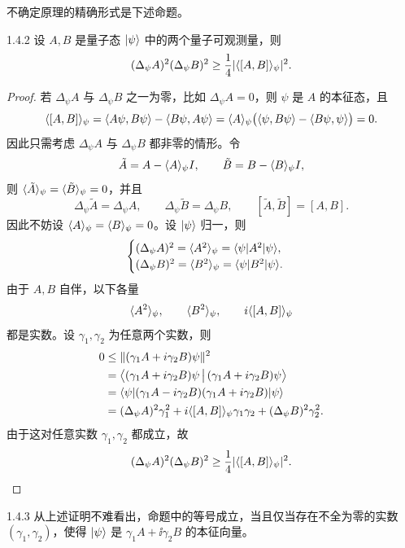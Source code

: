 不确定原理的精确形式是下述命题。

\begin{proposition}{1.4.2}
  设 $A,B$ 是量子态 $|\psi\rangle$ 中的两个量子可观测量，则
  \[
  (\Delta_{\psi}A)^2(\Delta_{\psi}B)^2\ge\frac14\lvert \langle [A,B]\rangle_{\psi}\rvert^2.
  \]
\end{proposition}

\begin{proof}
  若 $\Delta_{\psi}A$ 与 $\Delta_{\psi}B$ 之一为零，比如 $\Delta_{\psi}A=0$，则 $\psi$ 是 $A$ 的本征态，且
  \[
  \langle [A,B]\rangle_{\psi}=\left\langle A\psi,B\psi\right\rangle-\left\langle B\psi,A\psi\right\rangle
  =\langle A\rangle_{\psi}\bigl(\left\langle \psi,B\psi\right\rangle-\left\langle B\psi,\psi\right\rangle\bigr)=0.
  \]
  因此只需考虑 $\Delta_{\psi}A$ 与 $\Delta_{\psi}B$ 都非零的情形。令
  \[
  \tilde A=A-\langle A\rangle_{\psi}I,\qquad \tilde B=B-\langle B\rangle_{\psi}I,
  \]
  则 $\langle \tilde A\rangle_{\psi}=\langle \tilde B\rangle_{\psi}=0$，并且
  \[
  \Delta_{\psi}\tilde A=\Delta_{\psi}A,\qquad
  \Delta_{\psi}\tilde B=\Delta_{\psi}B,\qquad
  [\tilde A,\tilde B]=[A,B].
  \]
  因此不妨设 $\langle A\rangle_{\psi}=\langle B\rangle_{\psi}=0$。设 $|\psi\rangle$ 归一，则
  \[
  \begin{cases}
  (\Delta_{\psi}A)^2=\langle A^2\rangle_{\psi}=\langle \psi|A^2|\psi\rangle,\\
  (\Delta_{\psi}B)^2=\langle B^2\rangle_{\psi}=\langle \psi|B^2|\psi\rangle.
  \end{cases}
  \]
  由于 $A,B$ 自伴，以下各量
  \[
  \langle A^2\rangle_{\psi},\qquad \langle B^2\rangle_{\psi},\qquad i\langle [A,B]\rangle_{\psi}
  \]
  都是实数。设 $\gamma_1,\gamma_2$ 为任意两个实数，则
  \[
  \begin{aligned}
  0&\le\lVert (\gamma_1A+i\gamma_2B)\psi\rVert^2\\
  &=\bigl\langle(\gamma_1A+i\gamma_2B)\psi\,\big|\,(\gamma_1A+i\gamma_2B)\psi\bigr\rangle\\
  &=\langle \psi|(\gamma_1A-i\gamma_2B)(\gamma_1A+i\gamma_2B)|\psi\rangle\\
  &=(\Delta_{\psi}A)^2\gamma_1^2+i\langle [A,B]\rangle_{\psi}\gamma_1\gamma_2
  +(\Delta_{\psi}B)^2\gamma_2^2.
  \end{aligned}
  \]
  由于这对任意实数 $\gamma_1,\gamma_2$ 都成立，故
  \[
  (\Delta_{\psi}A)^2(\Delta_{\psi}B)^2\ge\frac14\lvert \langle [A,B]\rangle_{\psi}\rvert^2.
  \]
\end{proof}

\begin{remark}{1.4.3}
  从上述证明不难看出，命题中的等号成立，当且仅当存在不全为零的实数 $(\gamma_1,\gamma_2)$，使得 $|\psi\rangle$ 是 $\gamma_1A+\ii\gamma_2B$ 的本征向量。
\end{remark}

